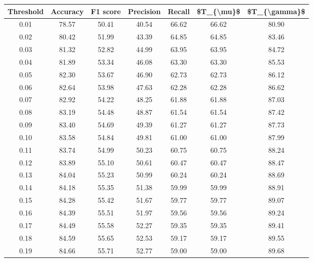 \begin{tabular}{|c|c|c|c|c|c|c|}
\hline
 Threshold &  Accuracy &  F1 score &  Precision &  Recall &  \$T\_\{\textbackslash mu\}\$ &  \$T\_\{\textbackslash gamma\}\$ \\
\hline
      0.01 &     78.57 &     50.41 &      40.54 &   66.62 &      66.62 &         80.90 \\
      0.02 &     80.42 &     51.99 &      43.39 &   64.85 &      64.85 &         83.46 \\
      0.03 &     81.32 &     52.82 &      44.99 &   63.95 &      63.95 &         84.72 \\
      0.04 &     81.89 &     53.34 &      46.08 &   63.30 &      63.30 &         85.53 \\
      0.05 &     82.30 &     53.67 &      46.90 &   62.73 &      62.73 &         86.12 \\
      0.06 &     82.64 &     53.98 &      47.63 &   62.28 &      62.28 &         86.62 \\
      0.07 &     82.92 &     54.22 &      48.25 &   61.88 &      61.88 &         87.03 \\
      0.08 &     83.19 &     54.48 &      48.87 &   61.54 &      61.54 &         87.42 \\
      0.09 &     83.40 &     54.69 &      49.39 &   61.27 &      61.27 &         87.73 \\
      0.10 &     83.58 &     54.84 &      49.81 &   61.00 &      61.00 &         87.99 \\
      0.11 &     83.74 &     54.99 &      50.23 &   60.75 &      60.75 &         88.24 \\
      0.12 &     83.89 &     55.10 &      50.61 &   60.47 &      60.47 &         88.47 \\
      0.13 &     84.04 &     55.23 &      50.99 &   60.24 &      60.24 &         88.69 \\
      0.14 &     84.18 &     55.35 &      51.38 &   59.99 &      59.99 &         88.91 \\
      0.15 &     84.28 &     55.42 &      51.67 &   59.77 &      59.77 &         89.07 \\
      0.16 &     84.39 &     55.51 &      51.97 &   59.56 &      59.56 &         89.24 \\
      0.17 &     84.49 &     55.58 &      52.27 &   59.35 &      59.35 &         89.41 \\
      0.18 &     84.59 &     55.65 &      52.53 &   59.17 &      59.17 &         89.55 \\
      0.19 &     84.66 &     55.71 &      52.77 &   59.00 &      59.00 &         89.68 \\

\end{tabular}
